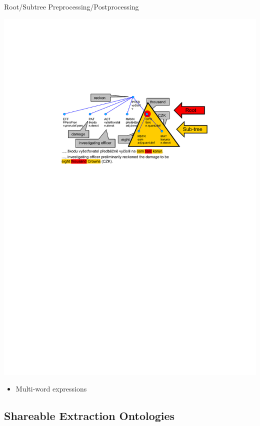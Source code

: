 \documentclass[xcolor=dvipsnames]{beamer}
\begin{document}
\begin{frame}{Root/Subtree Preprocessing/Postprocessing}
\centerline{\includegraphics[width=\hsize]{img/tree-subtree}}
\bigskip
\begin{itemize}
	\item Multi-word expressions
\end{itemize}
\end{frame}



\subsection{Shareable Extraction Ontologies}
\end{document}
